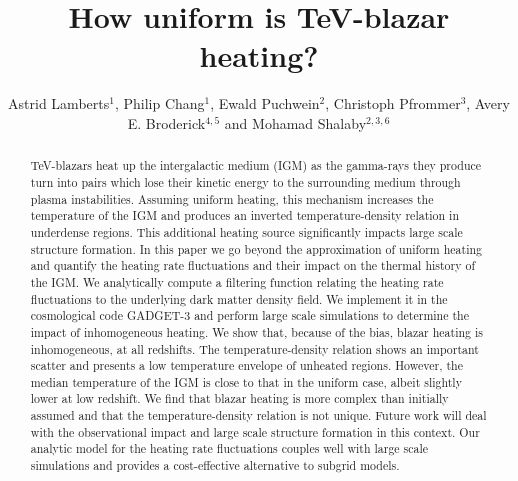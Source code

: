 \documentclass[twocolumns]{emulateapj}
\begin{document}
\title{How uniform is TeV-blazar heating?}

\author{Astrid Lamberts$^1$, Philip Chang$^1$, Ewald Puchwein$^2$, Christoph Pfrommer$^3$, Avery E. Broderick$^{4,5}$ and Mohamad Shalaby$^{2,3,6}$}


\begin{abstract}
TeV-blazars heat up the intergalactic medium (IGM) as the gamma-rays they produce turn into pairs which lose their kinetic energy to the surrounding medium through plasma instabilities.  Assuming uniform heating, this mechanism increases the temperature of the IGM and produces an inverted temperature-density relation in underdense regions. This additional heating source significantly impacts large scale structure formation. In this paper we go beyond the approximation of uniform heating and quantify the heating rate fluctuations and their impact on the thermal history of the IGM. We analytically compute a filtering function relating the heating rate fluctuations to the underlying  dark matter density field. We implement it in the cosmological code GADGET-3 and perform large scale simulations to determine the impact of inhomogeneous heating. We show that, because of the bias, blazar heating is inhomogeneous, at all redshifts. The temperature-density relation shows an important scatter and presents a low temperature envelope of unheated regions. However, the median temperature of the IGM is close to that in the uniform case, albeit slightly lower at low redshift. We find that blazar heating is more complex than initially assumed and that the temperature-density relation is not unique. Future work will deal with the observational impact and large scale structure formation in this context.  Our analytic model for the heating rate fluctuations couples well with large scale simulations and provides a cost-effective alternative to subgrid models.
\end{abstract}
\end{document}
